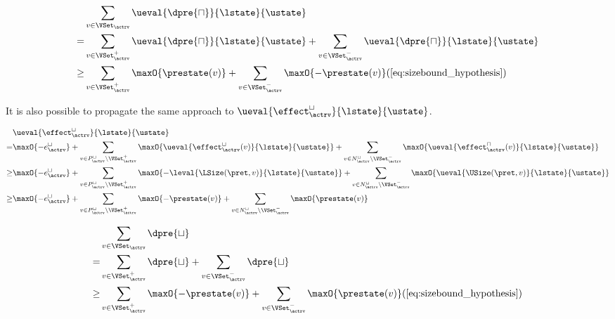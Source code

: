 \begin{equation} \label{eq:d_upper_reduction}
  \begin{split} 
  & \sum_{v \in \VSet_\actrv} \ueval{\dpre{\sqcap}}{\lstate}{\ustate} \\
  = & \sum_{v \in \VSet^+_\actrv} \ueval{\dpre{\sqcap}}{\lstate}{\ustate} + \sum_{v \in \VSet^-_\actrv} \ueval{\dpre{\sqcap}}{\lstate}{\ustate} \\
  \geq & \sum_{v \in \VSet^+_\actrv} \maxO{\prestate(v)} + \sum_{v \in \VSet^-_\actrv} \maxO{-\prestate(v)} (\ref{eq:sizebound_hypothesis}) \\
  \end{split}      
\end{equation}

It is also possible to propagate the same approach to $\ueval{\effect^\sqcup_\actrv}{\lstate}{\ustate}$.


\begin{equation} \label{eq:input_rv_reduction_lower}
  \begin{split}
  & \ueval{\effect^\sqcup_\actrv}{\lstate}{\ustate} \\
  = & \maxO{-e^{\sqcup}_\actrv}
    + \sum_{v \in P_\actrv^\sqcup \setminus \VSet^+_\actrv} \maxO{\ueval{\effect^\sqcup_\actrv(v)}{\lstate}{\ustate}}
    + \sum_{v \in N_\actrv^\sqcup \setminus \VSet^-_\actrv} \maxO{\ueval{\effect^\sqcap_\actrv(v)}{\lstate}{\ustate}} \\
  \geq & \maxO{-e^{\sqcup}_\actrv}
    + \sum_{v \in P_\actrv^\sqcup \setminus \VSet^+_\actrv} \maxO{-\leval{\LSize(\pret, v)}{\lstate}{\ustate}}
    + \sum_{v \in N_\actrv^\sqcup \setminus \VSet^-_\actrv} \maxO{\ueval{\USize(\pret, v)}{\lstate}{\ustate}} \\
  \geq & \maxO{-e^{\sqcup}_\actrv}
    + \sum_{v \in P_\actrv^\sqcup \setminus \VSet^+_\actrv} \maxO{-\prestate(v)}
    + \sum_{v \in N_\actrv^\sqcup \setminus \VSet^-_\actrv} \maxO{\prestate(v)} \\
  \end{split}
\end{equation}

\begin{equation} \label{eq:d_lower_reduction}
  \begin{split} 
  & \sum_{v \in \VSet_\actrv} \dpre{\sqcup} \\
  = & \sum_{v \in \VSet^+_\actrv} \dpre{\sqcup} + \sum_{v \in \VSet^-_\actrv} \dpre{\sqcup} \\
  \geq & \sum_{v \in \VSet^+_\actrv} \maxO{-\prestate(v)} + \sum_{v \in \VSet^-_\actrv} \maxO{\prestate(v)} (\ref{eq:sizebound_hypothesis}) \\
  \end{split}      
\end{equation}

